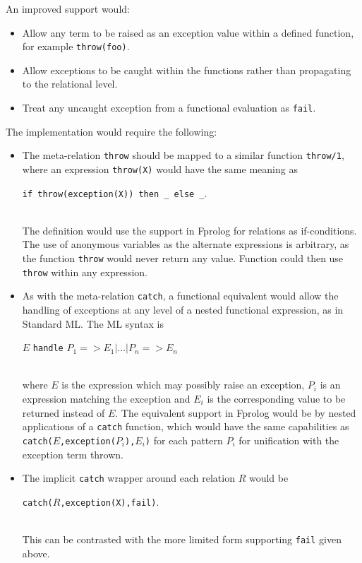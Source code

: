 \documentclass[a4paper,11pt,twoside]{article}
\begin{document}
An improved support would:
\begin{itemize}
\item{Allow any term to be raised as an exception value within a
  defined function, for example \texttt{throw(foo)}.}
\item{Allow exceptions to be caught within the functions rather than
  propagating to the relational level.}
\item{Treat any uncaught exception from a functional evaluation as
  \texttt{fail}.}
\end{itemize}
The implementation would require the following:
\begin{itemize}
\item{The meta-relation \texttt{throw} should be mapped to a
  similar function \texttt{throw/1}, 
  where an expression \texttt{throw(X)}
  would have the same meaning as\\
  \centerline{\texttt{if throw(exception(X)) then \_{} else \_{}}.}\\
  The
  definition would use the support in Fprolog for relations
  as if-conditions.  The use of anonymous variables as
  the alternate expressions is arbitrary, as the function
  \texttt{throw} would never return any value.
  Function could then use \texttt{throw}
  within any expression.}
\item{As with the meta-relation \texttt{catch}, a functional
  equivalent would allow the handling of exceptions at any
  level of a nested functional expression, as in Standard
  ML.  The ML syntax is\\
  \centerline{$E$ \texttt{handle} $P_1 => E_1 | \ldots | P_n => E_n$}\\
  where $E$ is the expression which may possibly raise an
  exception, $P_i$ is an expression matching the exception and
  $E_i$ is the corresponding
  value to be returned instead of $E$.  The equivalent support
  in Fprolog would be by nested applications of a
  \texttt{catch} function, which would have the same capabilities as
  \texttt{catch(}$E$\texttt{,exception(}$P_i$\texttt{),}$E_i$\texttt{)} for
  each pattern $P_i$ for unification with the exception term thrown.
  }
\item{The implicit \texttt{catch} wrapper around each relation $R$
  would be\\
  \centerline{\texttt{catch(}$R$\texttt{,exception(X),fail)}.}\\
  This can
  be contrasted with the more limited form supporting \texttt{fail}
  given above.
  }
\end{itemize}
\end{document}

